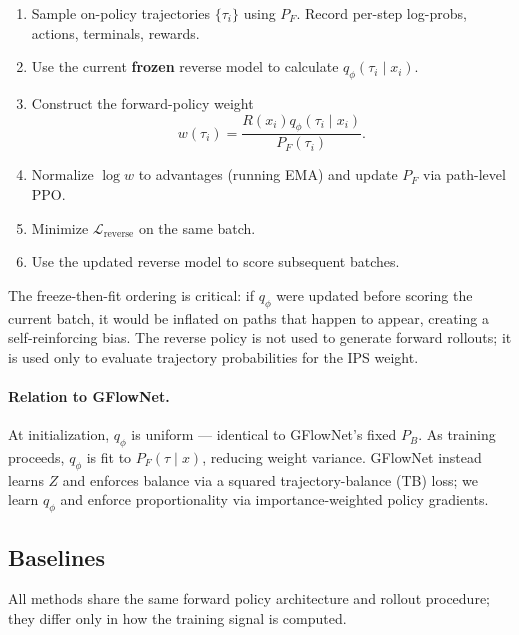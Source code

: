 \documentclass[11pt]{article}
\newcommand{\PF}{P_F}
\newcommand{\PB}{P_B}
\newcommand{\qphi}{q_\phi}
\newcommand{\R}{R}
\begin{document}
\begin{algorithm}[H]
\caption*{Algorithm 1: Learned-Reverse IPS-GRPO (one iteration)}
\begin{enumerate}
    \item Sample on-policy trajectories \(\{\tau_i\}\) using \(\PF\). Record per-step log-probs, actions, terminals, rewards.
    \item Use the current \textbf{frozen} reverse model to calculate \(\qphi(\tau_i\mid x_i)\).
    \item Construct the forward-policy weight
    \[
        w(\tau_i)
        =
        \frac{\R(x_i)\qphi(\tau_i\mid x_i)}{\PF(\tau_i)}.
    \]
    \item Normalize \(\log w\) to advantages (running EMA) and update \(\PF\) via path-level PPO.
    \item Minimize \(\mathcal{L}_{\mathrm{reverse}}\) on the same batch.
    \item Use the updated reverse model to score subsequent batches.
\end{enumerate}
\end{algorithm}

The freeze-then-fit ordering is critical: if \(\qphi\) were updated before scoring the current batch, it would be inflated on paths that happen to appear, creating a self-reinforcing bias. The reverse policy is not used to generate forward rollouts; it is used only to evaluate trajectory probabilities for the IPS weight.

\paragraph{Relation to GFlowNet.}
At initialization, \(\qphi\) is uniform --- identical to GFlowNet's fixed \(\PB\). As training proceeds, \(\qphi\) is fit to \(\PF(\tau\mid x)\), reducing weight variance. GFlowNet instead learns \(Z\) and enforces balance via a squared trajectory-balance (TB) loss; we learn \(\qphi\) and enforce proportionality via importance-weighted policy gradients.

\subsection{Baselines}

All methods share the same forward policy architecture and rollout procedure; they differ only in how the training signal is computed.
\end{document}
